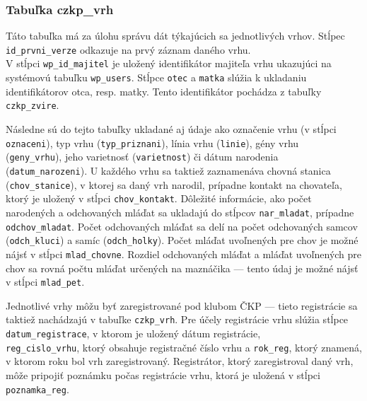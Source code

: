 \subsubsection*{Tabuľka czkp\_vrh}

Táto tabuľka má za úlohu správu dát týkajúcich sa jednotlivých vrhov. Stĺpec \texttt{id_prvni_verze} odkazuje na prvý záznam daného vrhu. \\ V stĺpci \texttt{wp_id_majitel} je uložený identifikátor majiteľa vrhu ukazujúci na systémovú tabuľku \texttt{wp_users}. Stĺpce \texttt{otec} a \texttt{matka} slúžia k ukladaniu identifikátorov otca, resp. matky. Tento identifikátor pochádza z tabuľky \texttt{czkp_zvire}.

Následne sú do tejto tabuľky ukladané aj údaje ako označenie vrhu (v stĺpci \texttt{oznaceni}), typ vrhu (\texttt{typ_priznani}), línia vrhu (\texttt{linie}), gény vrhu \\ (\texttt{geny_vrhu}), jeho varietnosť (\texttt{varietnost}) či dátum narodenia \\ (\texttt{datum_narozeni}). U každého vrhu sa taktiež zaznamenáva chovná stanica (\texttt{chov_stanice}), v ktorej sa daný vrh narodil, prípadne kontakt na chovateľa, ktorý je uložený v stĺpci \texttt{chov_kontakt}. Dôležité informácie, ako počet narodených a odchovaných mláďat sa ukladajú do stĺpcov \texttt{nar_mladat}, prípadne \texttt{odchov_mladat}. Počet odchovaných mláďat sa delí na počet odchovaných samcov (\texttt{odch_kluci}) a samíc (\texttt{odch_holky}). Počet mláďat uvoľnených pre chov je možné nájsť v stĺpci \texttt{mlad_chovne}. Rozdiel odchovaných mláďat a mláďat uvoľnených pre chov sa rovná počtu mláďat určených na maznáčika --- tento údaj je možné nájsť v stĺpci \texttt{mlad_pet}.

Jednotlivé vrhy môžu byť zaregistrované pod klubom ČKP --- tieto registrácie sa taktiež nachádzajú v tabuľke \texttt{czkp_vrh}. Pre účely registrácie vrhu slúžia stĺpce \texttt{datum_registrace}, v ktorom je uložený dátum registrácie, \\ \texttt{reg_cislo_vrhu}, ktorý obsahuje registračné číslo vrhu a \texttt{rok_reg}, ktorý znamená, v ktorom roku bol vrh zaregistrovaný. Registrátor, ktorý zaregistroval daný vrh, môže pripojiť poznámku počas registrácie vrhu, ktorá je uložená v stĺpci \texttt{poznamka_reg}.

